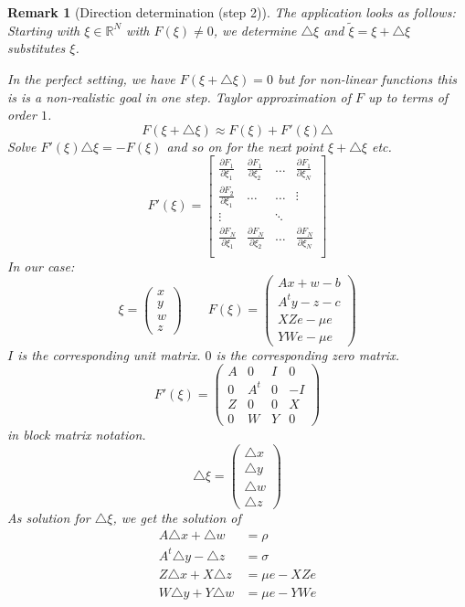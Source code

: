 \documentclass[a4paper]{article}
\numberwithin{lecref}{section}
\newtheorem*{Remark}{Remark}
\begin{document}
\begin{Remark}[Direction determination (step 2)]
	The application looks as follows:
	Starting with $\xi \in \mathbb R^N$ with $F(\xi) \neq 0$, we determine $\triangle \xi$ and $\tilde\xi = \xi + \triangle \xi$ substitutes $\xi$.

	In the perfect setting, we have $F(\xi + \triangle \xi) = 0$ but for non-linear functions this is is a non-realistic goal in one step.
	Taylor approximation of $F$ up to terms of order $1$.
	\[ F(\xi + \triangle \xi) \approx F(\xi) + F'(\xi) \triangle \]
	Solve $F'(\xi) \triangle \xi = -F(\xi)$ and so on for the next point $\xi + \triangle \xi$ etc.
	\[
		F'(\xi) = \begin{bmatrix}
			\frac{\partial F_1}{\partial \xi_1} & \frac{\partial F_1}{\partial \xi_2} & \dots & \frac{\partial F_1}{\partial \xi_N} \\
			\frac{\partial F_2}{\partial \xi_1} & \dots & \dots & \vdots \\
			\vdots &  & \ddots & \\
			\frac{\partial F_N}{\partial \xi_1} & \frac{\partial F_N}{\partial \xi_2} & \dots & \frac{\partial F_N}{\partial \xi_N} \\
		\end{bmatrix}
	\]
	In our case:
	\[ \xi = \begin{pmatrix} x \\ y \\ w \\ z \end{pmatrix} \qquad F(\xi) = \begin{pmatrix} Ax + w - b \\ A^t y - z - c \\ XZ e - \mu e \\ YW e - \mu e \end{pmatrix} \]
	$I$ is the corresponding unit matrix. $0$ is the corresponding zero matrix.
	\[ F'(\xi) = \begin{pmatrix} A & 0 & I & 0 \\ 0 & A^t & 0 & -I \\ Z & 0 & 0 & X \\ 0 & W & Y & 0 \end{pmatrix} \]
	in block matrix notation.
	\[ \triangle \xi = \begin{pmatrix} \triangle x \\ \triangle y \\ \triangle w \\ \triangle z \end{pmatrix} \]
	As solution for $\triangle \xi$, we get the solution of
	\begin{align*}
		A \triangle x + \triangle w &= \rho \\
		A^t \triangle y - \triangle z &= \sigma \\
		Z \triangle x + X \triangle z &= \mu e - XZe \\
		W \triangle y + Y \triangle w &= \mu e - YWe
	\end{align*}


\end{Remark}
\end{document}
